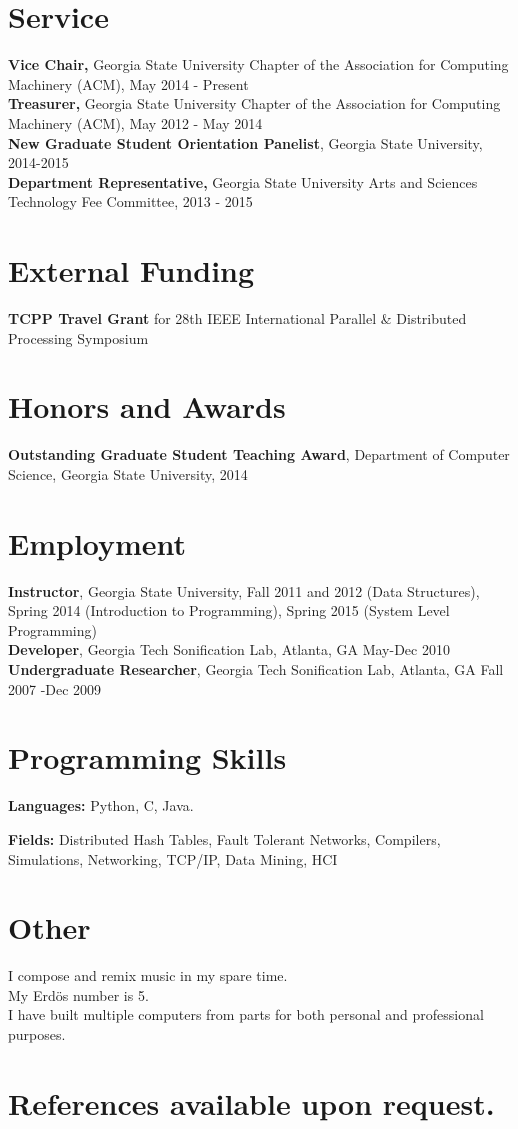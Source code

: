 \documentclass{res}
\begin{document}
\begin{resume}
\section{Service}
{\bf Vice Chair,} Georgia State University Chapter of the Association for Computing Machinery (ACM),  May 2014 - Present\\
{\bf Treasurer,} Georgia State University Chapter of the Association for Computing Machinery (ACM), May 2012 - May 2014\\
{\bf New Graduate Student Orientation Panelist}, Georgia State University, 2014-2015\\
{\bf Department Representative,} Georgia State University Arts and Sciences Technology Fee Committee, 2013 - 2015

\section{External Funding}
\textbf{TCPP Travel Grant} for 28th IEEE International Parallel \& Distributed Processing Symposium

\section{Honors and Awards}
\textbf{Outstanding Graduate Student Teaching Award}, Department of Computer Science, Georgia State University, 2014

\section{Employment}
{\bf Instructor}, Georgia State University, Fall 2011 and 2012 (Data Structures), Spring 2014 (Introduction to Programming), Spring 2015 (System Level Programming)\\
{\bf Developer}, Georgia Tech Sonification Lab, Atlanta, GA May-Dec 2010\\
{\bf Undergraduate Researcher}, Georgia Tech Sonification Lab, Atlanta, GA Fall 2007 -Dec 2009

\section{Programming Skills}
{\bf Languages:} Python, C, Java.

{\bf Fields:} Distributed Hash Tables, Fault Tolerant Networks, Compilers, Simulations, Networking, TCP/IP, Data Mining,  HCI


\section{Other}
I compose and remix music in my spare time.\\
My Erd\"{o}s number is 5.\\
I have built multiple computers from parts for both personal and professional purposes.


\end{resume} 
\section{References available upon request.}
\end{document}
